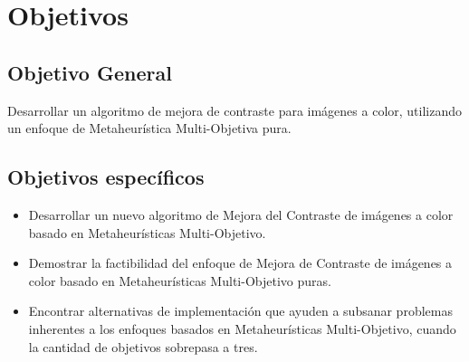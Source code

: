 \section{Objetivos}
\subsection{Objetivo General}
Desarrollar un algoritmo de mejora de contraste para imágenes a color, utilizando un enfoque de Metaheurística Multi-Objetiva pura. 
\subsection{Objetivos específicos}
\begin{itemize}

	\item Desarrollar un nuevo algoritmo de Mejora del Contraste de imágenes a color basado en Metaheurísticas Multi-Objetivo.

	\item Demostrar la factibilidad del enfoque de Mejora de Contraste de imágenes a color basado en Metaheurísticas Multi-Objetivo puras.

	\item Encontrar alternativas de implementación que ayuden a subsanar problemas inherentes a los enfoques basados en Metaheurísticas Multi-Objetivo, cuando la cantidad de objetivos sobrepasa a tres.
	
	
	
	
	
	
	
\end{itemize}

